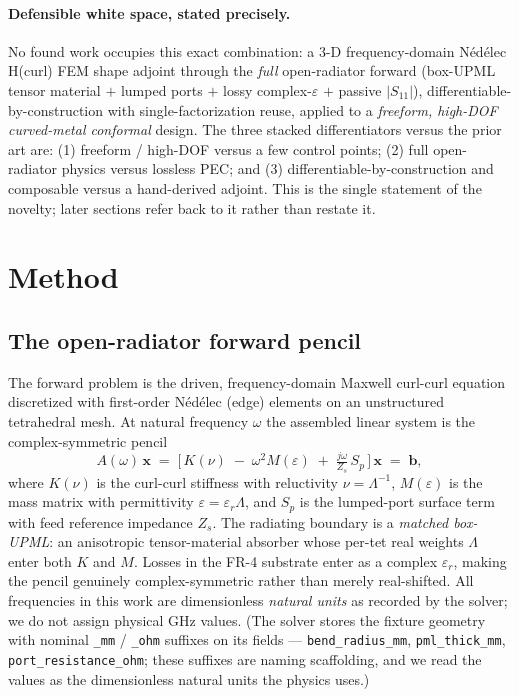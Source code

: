 \documentclass{anvil-paper}
\begin{document}
\paragraph{Defensible white space, stated precisely.}
\label{sec:whitespace}
No found work occupies this exact combination: a 3-D frequency-domain N\'ed\'elec
H(curl) FEM shape adjoint through the \emph{full} open-radiator forward
(box-UPML tensor material $+$ lumped ports $+$ lossy complex-$\varepsilon$ $+$
passive $|S_{11}|$), differentiable-by-construction with single-factorization
reuse, applied to a \emph{freeform, high-DOF curved-metal conformal} design. The
three stacked differentiators versus the prior art are: (1) freeform / high-DOF
versus a few control points; (2) full open-radiator physics versus lossless
PEC; and (3) differentiable-by-construction and composable versus a hand-derived
adjoint. This is the single statement of the novelty; later sections refer back
to it rather than restate it.

\section{Method}
\label{sec:method}

\subsection{The open-radiator forward pencil}
\label{sec:pencil}

The forward problem is the driven, frequency-domain Maxwell curl-curl equation
discretized with first-order N\'ed\'elec (edge) elements on an unstructured
tetrahedral mesh. At natural frequency $\omega$ the assembled linear system is
the complex-symmetric pencil
\begin{equation}
  A(\omega)\,\mathbf{x} \;=\; \Big[\,K(\nu)\;-\;\omega^2 M(\varepsilon)\;+\;\tfrac{j\omega}{Z_s}\,S_p\,\Big]\,\mathbf{x}
  \;=\; \mathbf{b},
  \label{eq:pencil}
\end{equation}
where $K(\nu)$ is the curl-curl stiffness with reluctivity $\nu=\Lambda^{-1}$,
$M(\varepsilon)$ is the mass matrix with permittivity $\varepsilon=\varepsilon_r\Lambda$,
and $S_p$ is the lumped-port surface term with feed reference impedance
$Z_s$. The radiating boundary is a \emph{matched box-UPML}: an anisotropic
tensor-material absorber whose per-tet real weights $\Lambda$ enter both $K$ and
$M$. Losses in the FR-4 substrate enter as a complex $\varepsilon_r$, making the
pencil genuinely complex-symmetric rather than merely real-shifted. All
frequencies in this work are dimensionless \emph{natural units} as recorded by
the solver; we do not assign physical GHz values. (The solver stores the fixture
geometry with nominal \texttt{\_mm} / \texttt{\_ohm} suffixes on its fields ---
\texttt{bend\_radius\_mm}, \texttt{pml\_thick\_mm}, \texttt{port\_resistance\_ohm};
these suffixes are naming scaffolding, and we read the values as the dimensionless
natural units the physics uses.)
\end{document}
